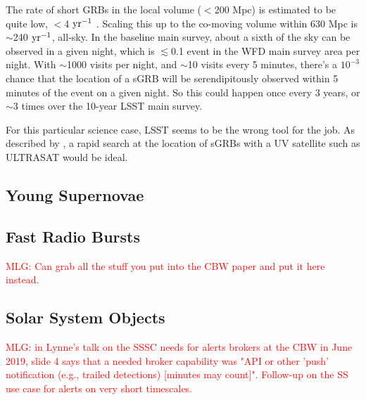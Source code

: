 \documentclass[DM,lsstdraft,authoryear,toc]{lsstdoc}
\begin{document}

The rate of short GRBs in the local volume ($<$200 Mpc) is estimated to be quite low, $<$4 $\rm yr^{-1}$ \citep{2019arXiv190800100M}. Scaling this up to the co-moving volume within 630 Mpc is $\sim$240 $\rm yr^{-1}$, all-sky. In the baseline main survey, about a sixth of the sky can be observed in a given night, which is $\lesssim$0.1 event in the WFD main survey area per night. With $\sim$1000 visits per night, and $\sim$10 visits every 5 minutes, there's a $10^{-3}$ chance that the location of a sGRB will be serendipitously observed within 5 minutes of the event on a given night. So this could happen once every 3 years, or $\sim$3 times over the 10-year LSST main survey.

For this particular science case, LSST seems to be the wrong tool for the job. As described by \citet{2018MNRAS.473..576G}, a rapid search at the location of sGRBs with a UV satellite such as ULTRASAT would be ideal.



\subsection{Young Supernovae}\label{ssec:latency_ysne}


\subsection{Fast Radio Bursts}\label{ssec:latency_frb}

\textcolor{red}{MLG: Can grab all the stuff you put into the CBW paper and put it here instead.}


\subsection{Solar System Objects}\label{ssec:latency_sso}

\textcolor{red}{MLG: in Lynne's talk on the SSSC needs for alerts brokers at the CBW in June 2019, slide 4 says that a needed broker capability was "API or other 'push' notification (e.g., trailed detections) [minutes may count]". Follow-up on the SS use case for alerts on very short timescales.}
\end{document}
